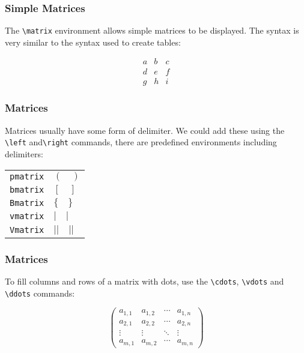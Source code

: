 \documentclass[mathserif]{beamer}
\begin{document}
\begin{frame}[fragile]
\frametitle{Simple Matrices}
\vfill
The \texttt{{\textbackslash}matrix} environment allows simple matrices to be displayed. The syntax is very similar to the syntax used to create tables:
\vfill
	\begin{LTXexample}[style=latexsty]
		\[ \begin{matrix}
		   a & b & c \\
		   d & e & f \\
		   g & h & i 
		\end{matrix} \]
	\end{LTXexample}
\vfill
\end{frame}

\begin{frame}[fragile]
\frametitle{Matrices}
\vfill
Matrices usually have some form of delimiter. We could add these using the \texttt{{\textbackslash}left} and\texttt{{\textbackslash}right} commands, there are predefined environments including delimiters:
\vfill
\begin{center}
\begin{tabular}{r | l | }
	\texttt{pmatrix} & $(\quad )$ \\
	\texttt{bmatrix} & $[\quad ]$  \\
	\texttt{Bmatrix} & $\{\quad \}$  \\
	\texttt{vmatrix} & $|\quad |$  \\
	\texttt{Vmatrix} & $||\quad ||$ 
\end{tabular}
\end{center}
\vfill
\end{frame}

\begin{frame}[fragile]
\frametitle{Matrices}
\vfill
To fill columns and rows of a matrix with dots, use the \texttt{{\textbackslash}cdots}, \texttt{{\textbackslash}vdots} and \texttt{{\textbackslash}ddots} commands:
\vfill
	\begin{LTXexample}[style=latexsty]
		\begin{equation}
		 \begin{pmatrix}
		   a_{1,1} & a_{1,2} & \cdots & a_{1,n} \\
		   a_{2,1} & a_{2,2} & \cdots & a_{2,n} \\
		   \vdots & \vdots & \ddots & \vdots \\
		   a_{m,1} & a_{m,2} & \cdots & a_{m,n}
		\end{pmatrix}
		\end{equation}
	\end{LTXexample}
\vfill
\end{frame}
\end{document}
